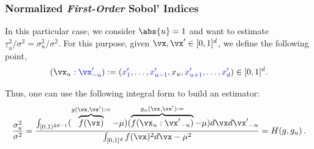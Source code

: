 \documentclass[11pt,compress]{beamer} %
\DeclareMathOperator{\Var}{Var}
\begin{document}
\begin{frame}
\frametitle{Normalized \emph{First-Order} Sobol' Indices}
In this particular case, we consider $\abs{u}=1$ and want to estimate $\underline{\tau}_u^2/\sigma^2=\sigma_u^2/\sigma^2$. For this purpose, given $\vx,\vx'\in [0,1]^d$, we define the following point,
\begin{gather*}
(\vx_u:{\color{blue}\vx'_{-u}}) := ({\color{blue}x'_1},\dots,{\color{blue}x'_{u-1}},x_u,{\color{blue}x'_{u+1}},\dots,{\color{blue}x'_d})\in [0,1]^d.
\end{gather*}

Thus, one can use the following integral form to build an estimator:
\begin{equation*}
\frac{\sigma_u^2}{\sigma^2}=\frac{\int_{[0,1)^{2d-1}}(\overbrace{f(\vx)}^{g(\vx,\vx'):=} - \mu) (\overbrace{f(\vx_u:{\vx'}_{-u})}^{g_u(\vx,\vx'):=}-\mu) d\vx d{\vx'}_{-u}}{\int_{[0,1]^d} f(\vx)^2 d{\vx}-\mu^2}=H(g,g_u)\, .
\end{equation*}
\end{frame}

\end{document}
